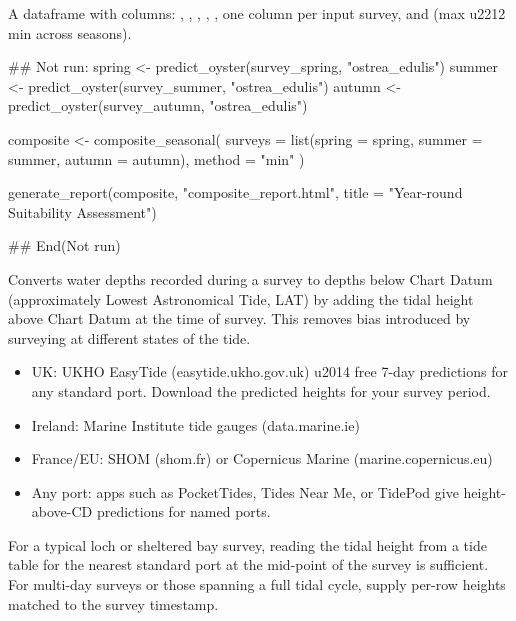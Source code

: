 \documentclass[a4paper]{book}
\begin{document}
%
\begin{Value}
A dataframe with columns: , , ,
, , one  column per
input survey, and  (max \bsl{}u2212 min across seasons).
\end{Value}
%
\begin{Examples}
\begin{ExampleCode}
## Not run: 
spring <- predict_oyster(survey_spring, "ostrea_edulis")
summer <- predict_oyster(survey_summer, "ostrea_edulis")
autumn <- predict_oyster(survey_autumn, "ostrea_edulis")

composite <- composite_seasonal(
  surveys = list(spring = spring, summer = summer, autumn = autumn),
  method  = "min"
)

generate_report(composite, "composite_report.html",
                title = "Year-round Suitability Assessment")

## End(Not run)
\end{ExampleCode}
\end{Examples}
%
\begin{Description}
Converts water depths recorded during a survey to depths below Chart Datum
(approximately Lowest Astronomical Tide, LAT) by adding the tidal height
above Chart Datum at the time of survey. This removes bias introduced by
surveying at different states of the tide.

 

\begin{itemize}

\item{} UK: UKHO EasyTide (easytide.ukho.gov.uk) \bsl{}u2014 free 7-day predictions for
any standard port. Download the predicted heights for your survey period.
\item{} Ireland: Marine Institute tide gauges (data.marine.ie)
\item{} France/EU: SHOM (shom.fr) or Copernicus Marine (marine.copernicus.eu)
\item{} Any port: apps such as PocketTides, Tides Near Me, or TidePod give
height-above-CD predictions for named ports.

\end{itemize}


For a typical loch or sheltered bay survey, reading the tidal height from a
tide table for the nearest standard port at the mid-point of the survey is
sufficient. For multi-day surveys or those spanning a full tidal cycle,
supply per-row heights matched to the survey timestamp.
\end{Description}
\end{document}
